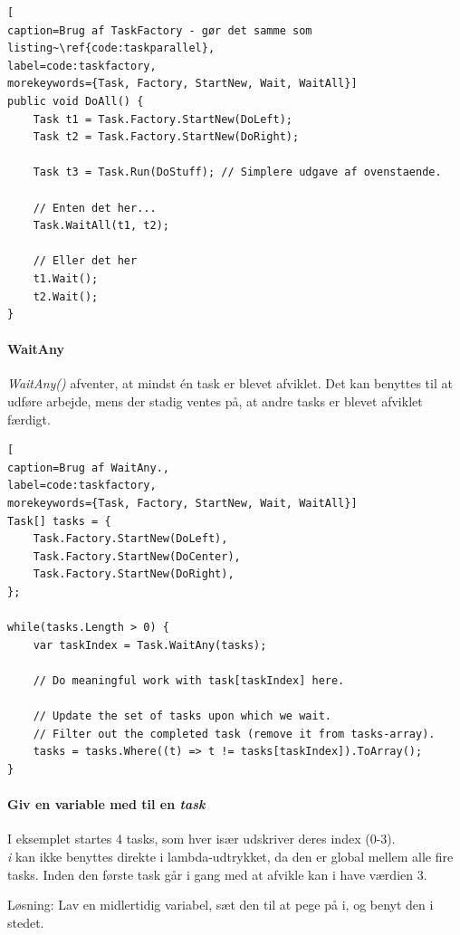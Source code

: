 \begin{lstlisting}[
caption=Brug af TaskFactory - gør det samme som listing~\ref{code:taskparallel},
label=code:taskfactory,
morekeywords={Task, Factory, StartNew, Wait, WaitAll}]
public void DoAll() {
	Task t1 = Task.Factory.StartNew(DoLeft);
	Task t2 = Task.Factory.StartNew(DoRight);
	
	Task t3 = Task.Run(DoStuff); // Simplere udgave af ovenstaende.
	
	// Enten det her...
	Task.WaitAll(t1, t2);
	
	// Eller det her
	t1.Wait();
	t2.Wait();
}
\end{lstlisting}

\paragraph{WaitAny}
\textit{WaitAny()} afventer, at mindst én task er blevet afviklet. Det kan benyttes til at udføre arbejde, mens der stadig ventes på, at andre tasks er blevet afviklet færdigt.

\begin{lstlisting}[
caption=Brug af WaitAny.,
label=code:taskfactory,
morekeywords={Task, Factory, StartNew, Wait, WaitAll}]
Task[] tasks = {
	Task.Factory.StartNew(DoLeft),
	Task.Factory.StartNew(DoCenter),
	Task.Factory.StartNew(DoRight),
};

while(tasks.Length > 0) {
	var taskIndex = Task.WaitAny(tasks);
	
	// Do meaningful work with task[taskIndex] here.
	
	// Update the set of tasks upon which we wait.
	// Filter out the completed task (remove it from tasks-array).
	tasks = tasks.Where((t) => t != tasks[taskIndex]).ToArray();
}
\end{lstlisting}

\paragraph{Giv en variable med til en \textit{task}}
I eksemplet startes 4 tasks, som hver især udskriver deres index (0-3).\\

\textit{i} kan ikke benyttes direkte i lambda-udtrykket, da den er global mellem alle fire tasks. Inden den første task går i gang med at afvikle kan i have værdien 3.

Løsning: Lav en midlertidig variabel, sæt den til at pege på i, og benyt den i stedet.

